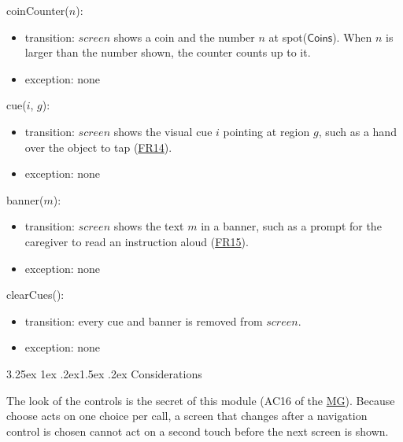 \documentclass[10pt, titlepage]{article}
\makeatletter
\newcommand{\srsurl}{https://team-hindsight.github.io/ophthamology-game/SRS/SRS.pdf}
\newcommand{\srsitemref}[2]{\href{\srsurl\#nameddest=#1}{#2}}
\newcommand{\mgurl}{https://github.com/team-hindsight/ophthamology-game/blob/main/pdfs/Design/SoftArchitecture/MG.pdf}
\newcommand{\mg}{\href{\mgurl}{MG}}
\renewcommand\paragraph{\@startsection{paragraph}{4}{\z@}%
  {3.25ex \@plus 1ex \@minus .2ex}{1.5ex \@plus .2ex}%
  {\normalfont\normalsize\bfseries}}
\newcommand{\T}[1]{\mathit{#1}}          %
\newcommand{\V}[1]{\mathsf{#1}}          %
\makeatother
\begin{document}
\begin{samepage}
\noindent coinCounter($n$):
\begin{itemize}
\item transition: $\T{screen}$ shows a coin and the number $n$ at
  spot($\V{Coins}$). When $n$ is larger than the number shown, the counter
  counts up to it.
\item exception: none
\end{itemize}
\end{samepage}
\par\pagebreak[0]

\begin{samepage}
\noindent cue($i$, $g$):
\begin{itemize}
\item transition: $\T{screen}$ shows the visual cue $i$ pointing at region
  $g$, such as a hand over the object to tap (\srsitemref{FR_VisualCues}{FR14}).
\item exception: none
\end{itemize}
\end{samepage}
\par\pagebreak[0]

\begin{samepage}
\noindent banner($m$):
\begin{itemize}
\item transition: $\T{screen}$ shows the text $m$ in a banner, such as a
  prompt for the caregiver to read an instruction aloud
  (\srsitemref{FR_NarrationFallback}{FR15}).
\item exception: none
\end{itemize}
\end{samepage}
\par\pagebreak[0]

\begin{samepage}
\noindent clearCues():
\begin{itemize}
\item transition: every cue and banner is removed from $\T{screen}$.
\item exception: none
\end{itemize}
\end{samepage}
\par\pagebreak[0]

\paragraph{Considerations}

The look of the controls is the secret of this module (AC16 of the \mg{}).
Because choose acts on one choice per call, a screen that changes after a
navigation control is chosen cannot act on a second touch before the next
screen is shown.
\end{document}
